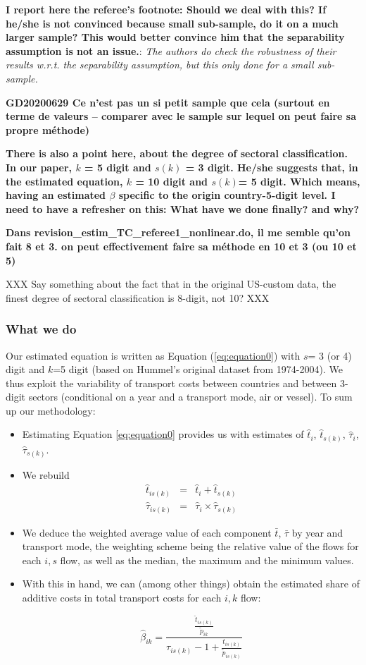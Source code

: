 \documentclass[a4paper,12pt]{article}
\begin{document}
\textbf{I report here the referee's footnote: Should we deal with this? If he/she is not convinced because small sub-sample, do it on a much larger sample? This would better convince him that the separability assumption is not an issue.}: \textit{The authors do check the robustness of their results w.r.t. the separability assumption, but this only done for a small sub-sample.}

\textbf{GD20200629 Ce n’est pas un si petit sample que cela (surtout en terme de valeurs -- comparer avec le sample sur lequel on peut faire sa propre méthode)}



\textbf{There is also a point here, about the degree of sectoral classification. In our paper, $k$ = 5 digit and $s(k)$ = 3 digit. He/she suggests that, in the estimated equation, $k$ = 10 digit and $s(k)$= 5 digit. Which means, having an estimated $\beta$ specific to the origin country-5-digit level. I need to have a refresher on this: What have we done finally? and why?}

\textbf{Dans revision_estim_TC_referee1_nonlinear.do, il me semble qu’on fait 8 et 3. on peut effectivement faire sa méthode en 10 et 3 (ou 10 et 5)}


XXX Say something about the fact that in the original US-custom data, the finest degree of sectoral classification is 8-digit, not 10? XXX

\subsubsection{What we do}

Our estimated equation is written as Equation (\ref{eq:equation0}) with $s$= 3 (or 4) digit and $k$=5 digit (based on Hummel's original dataset from 1974-2004). We thus exploit the variability of transport costs between countries and between 3-digit sectors (conditional on a year and a transport mode, air or vessel). To sum up our methodology:
\begin{itemize}
\item Estimating Equation \ref{eq:equation0} provides us with estimates of $\hat{t}_i$, $\hat{t}_{s(k)}$, $\hat{\tau}_i$, $\hat{\tau}_{s(k)}$.
\item We rebuild
\begin{eqnarray*}
\hat{t}_{is(k)} &= &\hat{t}_{i}+\hat{t}_{s(k)} \\
\hat{\tau}_{is(k)} &= & \hat{\tau}_{i}\times\hat{\tau}_{s(k)}
\end{eqnarray*}
\item We deduce the weighted average value of each component $\bar{t}$, $\bar{\tau}$ by year and transport mode, the weighting scheme being the relative value of the flows for each $i,s$ flow, as well as the median, the maximum and the minimum values.
\item With this in hand, we can (among other things) obtain the estimated share of additive costs in total transport costs for each $i,k$ flow:


$$\hat{\beta}_{ik} = \frac{\frac{\hat{t}_{is(k)}}{\tilde{p}_{ik}}}{\tau_{is(k)}-1 + \frac{t_{is(k)}}{\tilde{p}_{is(k)}}} $$
\end{itemize}
\end{document}
